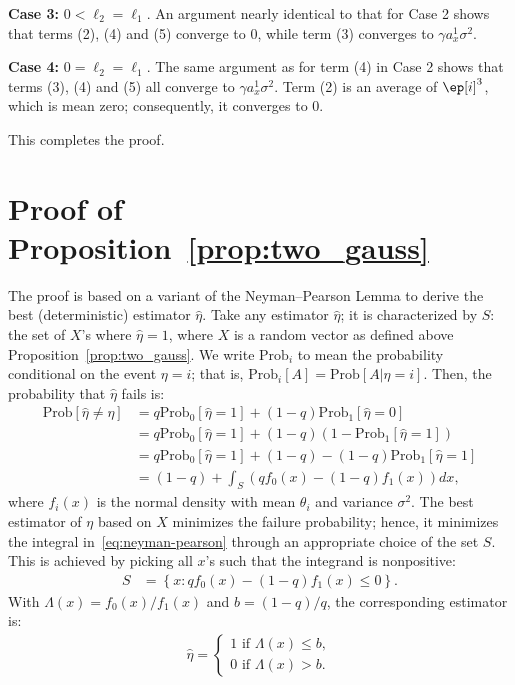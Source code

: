 \documentclass[9pt,twocolumn,twoside,lineno]{pnas-new}
\renewcommand{\P}{\mathrm{Prob}}
\begin{document}
{\bf Case 3:} $0<\ell_2 = \ell_1$. An argument nearly identical to that for Case 2 shows that terms (2), (4) and (5) converge to 0, while term (3) converges to $\gamma a_x^1 \sigma^2$.

{\bf Case 4:} $0=\ell_2 = \ell_1$. The same argument as for term (4) in Case 2 shows that terms (3), (4) and (5) all converge to $\gamma a_x^1 \sigma^2$. Term (2) is an average of $\ep[i]^3$, which is mean zero; consequently, it converges to 0.

This completes the proof.

\section{Proof of Proposition~\ref{prop:two_gauss}} \label{sec:proof_two_gauss}


The proof is based on  a variant of the Neyman--Pearson Lemma to derive the best (deterministic) estimator $\hat{\eta}$. Take any estimator $\hat{\eta}$; it is characterized by $S$: the set of $X$'s where $\hat{\eta} = 1$, where $X$ is a random vector as defined above Proposition~\ref{prop:two_gauss}. We write $\P_i$ to mean the probability conditional on the event $\eta = i$; that is, $\P_i[A] = \P[A | \eta = i]$. Then, the probability that $\hat{\eta}$ fails is:
%
\begin{align}
\label{eq:neyman-pearson}
%
\P[\hat{\eta} \ne \eta] 
&= q \P_0[\hat{\eta} = 1 ] + (1-q) \P_1[\hat{\eta} = 0]
\nonumber \\
&= q \P_0[\hat{\eta} = 1] + (1-q) (1 - \P_1[\hat{\eta} = 1])
\nonumber \\
&= q \P_0[\hat{\eta} = 1] + (1-q) - (1-q) \P_1[\hat{\eta} = 1]
\nonumber \\
&= (1-q)  + \int_S (q f_0(x) - (1-q) f_1(x))dx,
%
\end{align}
%
where $f_i(x)$ is the normal density with mean $\theta_i$ and variance $\sigma^2$. 
The best estimator of $\eta$ based on $X$ minimizes the failure probability; hence, it minimizes the integral in~\eqref{eq:neyman-pearson} through an appropriate choice of the set $S$. This is achieved by picking all $x$'s such that the integrand is nonpositive:
\begin{align*}
%
S & = \left\{x : qf_0(x) - (1-q)f_1(x) \leq 0 \right\}.
%
\end{align*}
%
With $\Lambda(x) = f_0(x) / f_1(x)$ and $b = (1-q) / q$, the corresponding estimator is:
\begin{align*}
%
\hat{\eta} = 
\begin{cases}
1  \text{ if } \Lambda(x) \leq b, \\
0  \text{ if } \Lambda(x) > b.
\end{cases}
%
\end{align*}
\end{document}
